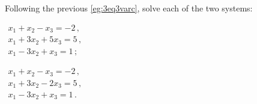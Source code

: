 \begin{example} \label{eg:3eq3vard}
Following the previous \autoref{eg:3eq3varc}, solve each of the two systems:
\begin{parts}
\item \(\begin{array}{l}
x_1+x_2-x_3=-2\,,\\
x_1+3x_2+5x_3=5\,,\\
x_1-3x_2+x_3=1\,;
\end{array}\)
\item \(\begin{array}{l}
x_1+x_2-x_3=-2\,,\\
x_1+3x_2-2x_3=5\,,\\
x_1-3x_2+x_3=1\,.
\end{array}\)
\end{parts}


\end{example}
